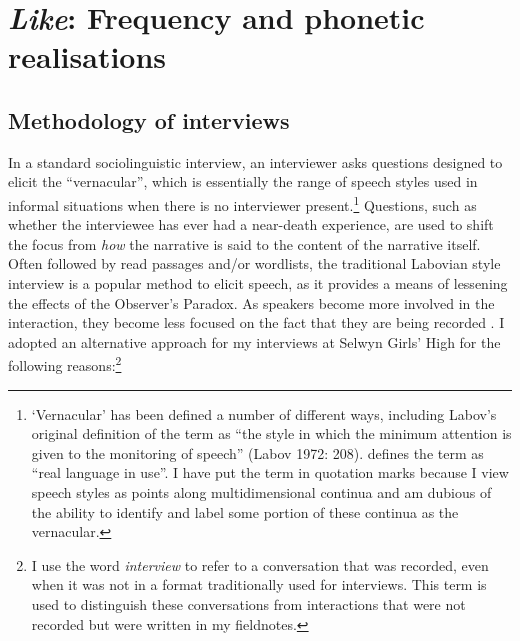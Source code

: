 

\chapter{\textit{Like}: Frequency and phonetic realisations}
\label{ch:prod}
\date{}

\section{Methodology of interviews}\label{interview:method}

In a standard sociolinguistic interview, an interviewer asks questions designed to elicit the ``vernacular'', which is essentially the range of speech styles used in informal situations when there is no interviewer present.\footnote{`Vernacular' has been defined a number of different ways, including Labov's original definition of the term as ``the style in which the minimum attention is given to the monitoring of speech'' (Labov 1972: 208).   defines the term as ``real language in use''.  I have put the term in quotation marks because I view speech styles as points along multidimensional continua and am dubious of the ability to identify and label some portion of these continua as the vernacular.}  Questions, such as whether the interviewee has ever had a near-death experience, are used to shift the focus from \textit{how} the narrative is said to the content of the narrative itself.  Often followed by read passages and/or wordlists, the traditional Labovian style interview is a popular method to elicit speech, as it provides a means of lessening the effects of the Observer's Paradox.  As speakers become more involved in the interaction, they become less focused on the fact that they are being recorded \cite{labov1972sociolingpatterns}.  I adopted an alternative approach for my interviews at Selwyn Girls' High for the following reasons:\footnote{I use the word \textit{interview} to refer to a conversation that was recorded, even when it was not in a format traditionally used for interviews.  This term is used to distinguish these conversations from interactions that were not recorded but were written in my fieldnotes.} 



